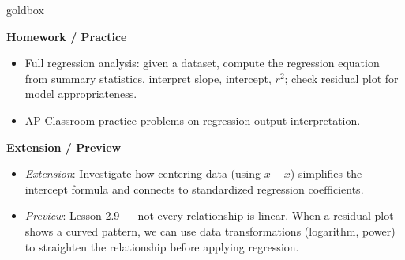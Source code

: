 \documentclass[10pt]{article}
\begin{document}
\begin{skillbox}{goldbox}
\begin{minipage}[t]{0.48\linewidth}
    \textbf{Homework / Practice}
    \begin{itemize}
        \item Full regression analysis: given a dataset, compute the regression equation from summary statistics, interpret slope, intercept, $r^2$; check residual plot for model appropriateness.
        \item AP Classroom practice problems on regression output interpretation.
    \end{itemize}
\end{minipage}
\hfill
\begin{minipage}[t]{0.48\linewidth}
    \textbf{Extension / Preview}
    \begin{itemize}
        \item \textit{Extension}: Investigate how centering data (using $x - \bar{x}$) simplifies the intercept formula and connects to standardized regression coefficients.
        \item \textit{Preview}: Lesson 2.9 --- not every relationship is linear. When a residual plot shows a curved pattern, we can use data transformations (logarithm, power) to straighten the relationship before applying regression.
    \end{itemize}
\end{minipage}
\end{skillbox}
\end{document}
